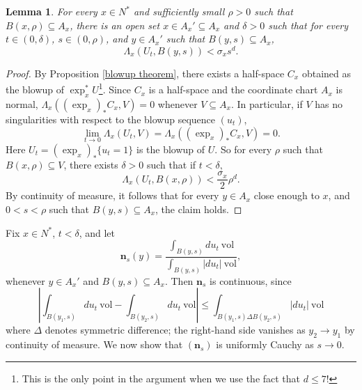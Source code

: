 \documentclass[reqno,12pt,letterpaper]{amsart}
\newcommand{\normal}{\mathbf n}
\newcommand{\vol}{\mathrm{vol}}
\newtheorem{lemma}[theorem]{Lemma}
\theoremstyle{definition}
\numberwithin{equation}{section}
\begin{document}
\begin{lemma}
For every $x \in N^*$ and sufficiently small $\rho > 0$ such that $B(x, \rho) \subseteq A_x$, there is an open set $x \in A_x' \subseteq A_x$ and $\delta > 0$ such that for every $t \in (0, \delta)$, $s \in (0, \rho)$, and $y \in A_x'$ such that $B(y, s) \subseteq A_x$,
\begin{equation}\label{basecase}\Lambda_x(U_t, B(y, s)) < \sigma_x s^d.\end{equation}
\end{lemma}
\begin{proof}
By Proposition \ref{blowup theorem}, there exists a half-space $C_x$ obtained as the blowup of $\exp_x^* U$\footnote{This is the only point in the argument when we use the fact that $d \leq 7$!}.
Since $C_x$ is a half-space and the coordinate chart $A_x$ is normal, $\Lambda_x((\exp_x)_* C_x, V) = 0$ whenever $V \subseteq A_x$.
In particular, if $V$ has no singularities with respect to the blowup sequence $(u_t)$,
$$\lim_{t \to 0} \Lambda_x(U_t, V) = \Lambda_x((\exp_x)_* C_x, V) = 0.$$
Here $U_t = (\exp_x)_* \{u_t = 1\}$ is the blowup of $U$.
So for every $\rho$ such that $B(x, \rho) \subseteq V$, there exists $\delta > 0$ such that if $t < \delta$,
$$\Lambda_x(U_t, B(x, \rho)) < \frac{\sigma_x}{2} \rho^d.$$
By continuity of measure, it follows that for every $y \in A_x$ close enough to $x$, and $0 < s < \rho$ such that $B(y, s) \subseteq A_x$, the claim holds.
\end{proof}

Fix $x \in N^*$, $t < \delta$, and let
$$\normal_s(y) = \frac{\int_{B(y, s)} du_t ~\vol}{\int_{B(y, s)} |du_t| ~\vol},$$
whenever $y \in A_x'$ and $B(y, s) \subseteq A_x$.
Then $\normal_s$ is continuous, since
$$\left|\int_{B(y_1, s)} du_t ~\vol - \int_{B(y_2, s)} du_t ~\vol\right| \leq \int_{B(y_1, s) \Delta B(y_2, s)} |du_t| ~\vol$$
where $\Delta$ denotes symmetric difference; the right-hand side vanishes as $y_2 \to y_1$ by continuity of measure.
We now show that $(\normal_s)$ is uniformly Cauchy as $s \to 0$.
\end{document}
